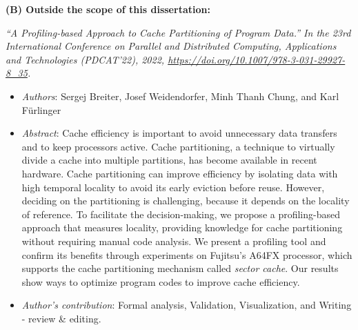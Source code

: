 \textbf{(B) Outside the scope of this dissertation:}

\textit{``A Profiling-based Approach to Cache Partitioning of Program Data.'' In the 23rd International Conference on Parallel and Distributed
Computing, Applications and Technologies (PDCAT’22), 2022, \url{https://doi.org/10.1007/978-3-031-29927-8_35}.}
\begin{itemize}
	\item \textit{Authors}: Sergej Breiter, Josef Weidendorfer, Minh Thanh Chung, and Karl Fürlinger 
	\item \textit{Abstract}: Cache efficiency is important to avoid unnecessary data transfers and to keep processors active. Cache partitioning, a technique to virtually divide a cache into multiple partitions, has become available in recent hardware. Cache partitioning can improve efficiency by isolating data with high temporal locality to avoid its early eviction before reuse. However, deciding on the partitioning is challenging, because it depends on the locality of reference. To facilitate the decision-making, we propose a profiling-based approach that measures locality, providing knowledge for cache partitioning without requiring manual code analysis. We present a profiling tool and confirm its benefits through experiments on Fujitsu's A64FX processor, which supports the cache partitioning mechanism called \textit{sector cache}. Our results show ways to optimize program codes to improve cache efficiency.
	\item \textit{Author's contribution}: Formal analysis, Validation, Visualization, and Writing - review \& editing.
\end{itemize}

